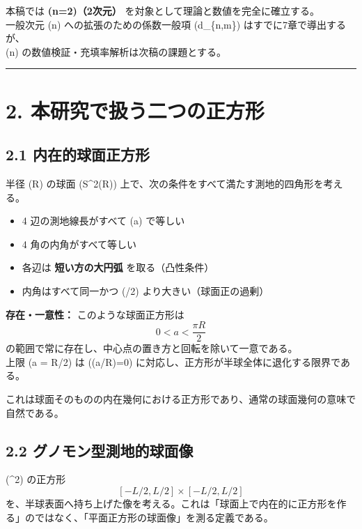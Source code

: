 \documentclass[
  12pt,
  a4paper,
]{article}
\providecommand{\tightlist}{%
  \setlength{\itemsep}{0pt}\setlength{\parskip}{0pt}}
\begin{document}
本稿では \textbf{(n=2)（2次元）}
を対象として理論と数値を完全に確立する。\\
一般次元 (n) への拡張のための係数一般項 (d\_\{n,m\})
はすでに7章で導出するが、\\
(n) の数値検証・充填率解析は次稿の課題とする。

\begin{center}\rule{0.5\linewidth}{0.5pt}\end{center}

\section{2.
本研究で扱う二つの正方形}\label{ux672cux7814ux7a76ux3067ux6271ux3046ux4e8cux3064ux306eux6b63ux65b9ux5f62}

\subsection{2.1
内在的球面正方形}\label{ux5185ux5728ux7684ux7403ux9762ux6b63ux65b9ux5f62}

半径 (R) の球面 (S\^{}2(R))
上で、次の条件をすべて満たす測地的四角形を考える。

\begin{itemize}
\tightlist
\item
  4 辺の測地線長がすべて (a) で等しい
\item
  4 角の内角がすべて等しい
\item
  各辺は \textbf{短い方の大円弧} を取る（凸性条件）
\item
  内角はすべて同一かつ (\pi/2) より大きい（球面正の過剰）
\end{itemize}

\textbf{存在・一意性：} このような球面正方形は \[
0 < a < \frac{\pi R}{2}
\] の範囲で常に存在し、中心点の置き方と回転を除いて一意である。\\
上限 (a = \pi R/2) は (\cos(a/R)=0)
に対応し、正方形が半球全体に退化する限界である。

これは球面そのものの内在幾何における正方形であり、通常の球面幾何の意味で自然である。

\subsection{2.2
グノモン型測地的球面像}\label{ux30b0ux30ceux30e2ux30f3ux578bux6e2cux5730ux7684ux7403ux9762ux50cf}

(\^{}2) の正方形 \[
[-L/2,L/2]\times[-L/2,L/2]
\]
を、半球表面へ持ち上げた像を考える。これは「球面上で内在的に正方形を作る」のではなく、「平面正方形の球面像」を測る定義である。
\end{document}
